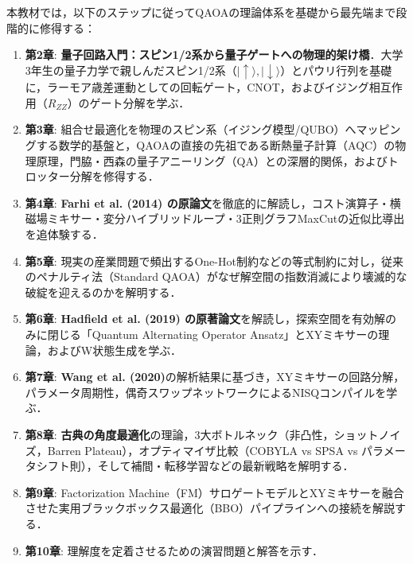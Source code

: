 \documentclass[11pt,a4paper,oneside,openany]{ltjsbook}
\theoremstyle{definition}
\theoremstyle{plain}
\theoremstyle{remark}
\newcommand{\ket}[1]{|#1\rangle}
\begin{document}
本教材では，以下のステップに従ってQAOAの理論体系を基礎から最先端まで段階的に修得する：
\begin{enumerate}\setlength{\itemsep}{0pt}\setlength{\parskip}{0pt}
    \item \textbf{第2章}: \textbf{量子回路入門：スピン1/2系から量子ゲートへの物理的架け橋}．大学3年生の量子力学で親しんだスピン1/2系（$\ket{\uparrow}, \ket{\downarrow}$）とパウリ行列を基礎に，ラーモア歳差運動としての回転ゲート，CNOT，およびイジング相互作用（$R_{ZZ}$）のゲート分解\cite{nielsen2010quantum,barenco1995elementary}を学ぶ．
    \item \textbf{第3章}: 組合せ最適化を物理のスピン系（イジング模型/QUBO）へマッピングする数学的基盤\cite{lucas2014ising}と，QAOAの直接の先祖である断熱量子計算（AQC）の物理原理\cite{farhi2000quantum,farhi2001quantum,born1928beweis,kato1950adiabatic,jansen2007bounds}，門脇・西森の量子アニーリング（QA）\cite{kadowaki1998quantum}との深層的関係，およびトロッター分解\cite{trotter1959product,suzuki1976generalized,lloyd1996universal}を修得する．
    \item \textbf{第4章}: \textbf{Farhi et al. (2014) の原論文}\cite{farhi2014quantum}を徹底的に解読し，コスト演算子・横磁場ミキサー・変分ハイブリッドループ・3正則グラフMaxCutの近似比導出を追体験する．
    \item \textbf{第5章}: 現実の産業問題で頻出するOne-Hot制約などの等式制約に対し，従来のペナルティ法（Standard QAOA）がなぜ解空間の指数消滅により壊滅的な破綻を迎えるのかを解明する\cite{lucas2014ising,choi2008different,hadfield2019from}．
    \item \textbf{第6章}: \textbf{Hadfield et al. (2019) の原著論文}\cite{hadfield2019from}を解読し，探索空間を有効解のみに閉じる「Quantum Alternating Operator Ansatz」とXYミキサーの理論，およびW状態生成\cite{bartschi2019deterministic}を学ぶ．
    \item \textbf{第7章}: \textbf{Wang et al. (2020)}\cite{wang2020xy}の解析結果に基づき，XYミキサーの回路分解，パラメータ周期性，偶奇スワップネットワーク\cite{kivlichan2018quantum}によるNISQコンパイルを学ぶ．
    \item \textbf{第8章}: \textbf{古典の角度最適化}の理論，3大ボトルネック（非凸性，ショットノイズ，Barren Plateau\cite{mcclean2018barren,wang2021noise}），オプティマイザ比較（COBYLA\cite{powell1994direct} vs SPSA\cite{spall1992multivariate} vs パラメータシフト則\cite{mitarai2018quantum,schuld2019evaluating}），そして補間\cite{zhou2020quantum}・転移学習\cite{brandao2018fixed,galda2021transferability,egger2021warm}などの最新戦略を解明する．
    \item \textbf{第9章}: Factorization Machine（FM\cite{rendle2010factorization}）サロゲートモデルとXYミキサーを融合させた実用ブラックボックス最適化（BBO\cite{kitai2020designing}）パイプラインへの接続を解説する．
    \item \textbf{第10章}: 理解度を定着させるための演習問題と解答を示す．
\end{enumerate}
\end{document}
